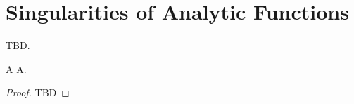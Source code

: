 \section{Singularities of Analytic Functions}

TBD.

\begin{theorem}{A}
    A.
\end{theorem}

\begin{proof}
TBD
\end{proof}

